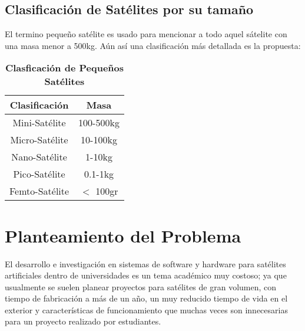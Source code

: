 \subsection{Clasificaci\'{o}n de Sat\'{e}lites por su tama\~{n}o}
El termino peque\~{n}o sat\'{e}lite es usado para mencionar a todo aquel s\'{a}telite con una masa menor a 500kg. A\'{u}n as\'{i} una  clasificaci\'{o}n m\'{a}s detallada es la propuesta:




\begin{table}[Clasificaci\'{o}n de Peque\~{n}os Sat\'{e}lites]
\centering
\begin{tabular}{ | c | c |}
	\hline
	Clasificaci\'{o}n & Masa \\ \hline
	Mini-Sat\'{e}lite & 100-500kg \\
	Micro-Sat\'{e}lite & 10-100kg \\
	Nano-Sat\'{e}lite & 1-10kg \\ 
	Pico-Sat\'{e}lite & 0.1-1kg \\
	Femto-Sat\'{e}lite & $ < $ 100gr \\ \hline
\end{tabular}
\caption[Clasificaci\'{o}n de Peque\~{n}os Sat\'{e}lites]{\textbf{Clasficaci\'{o}n de Peque\~{n}os Sat\'{e}lites}}
\end{table}


\section{Planteamiento del Problema}
El desarrollo e investigaci\'{o}n en sistemas de software y hardware para sat\'{e}lites artificiales dentro de universidades es un tema acad\'{e}mico muy costoso; ya que usualmente se suelen planear proyectos para sat\'{e}lites de gran volumen, con tiempo de fabricaci\'{o}n a m\'{a}s de un a\~{n}o, un muy reducido tiempo de vida en el exterior y caracter\'{i}sticas de funcionamiento que  muchas veces son innecesarias para un proyecto realizado por estudiantes.


